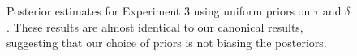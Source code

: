 \documentclass[doc,biblatex]{apa7}
\begin{document}
\clearpage

\begin{figure}
\vspace*{2pt}
\caption{Posterior estimates for Experiment 3 using uniform priors on $\tau$ and $\delta$. These results are almost identical to our canonical results, suggesting that our choice of priors is not biasing the posteriors.}
\label{supp5}
\end{figure}

\clearpage
\end{document}
